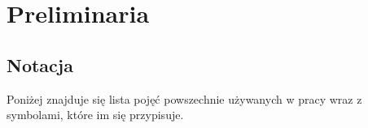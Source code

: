 \documentclass[12pt,a4paper]{report}
\begin{document}

\chapter{Preliminaria}  

\section{Notacja} 

Poniżej znajduje się lista pojęć powszechnie używanych w pracy wraz z symbolami, które im się przypisuje. 
  
\end{document}
